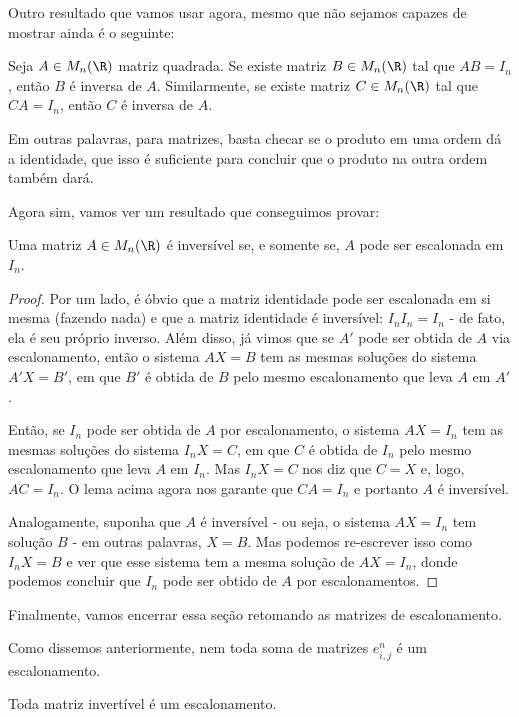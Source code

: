 Outro resultado que vamos usar agora, mesmo que não sejamos capazes de mostrar ainda é o seguinte:

\begin{lemma}
	Seja $A\in M_n(\R)$ matriz quadrada. Se existe matriz $B\in M_n(\R)$ tal que $AB=I_n$, então $B$ é inversa de $A$. Similarmente, se existe matriz $C\in M_n(\R)$ tal que $CA=I_n$, então $C$ é inversa de $A$.
\end{lemma}

Em outras palavras, para matrizes, basta checar se o produto em uma ordem dá a identidade, que isso é suficiente para concluir que o produto na outra ordem também dará.

Agora sim, vamos ver um resultado que conseguimos provar:

\begin{lemma}
	Uma matriz $A\in M_n(\R)$ é inversível se, e somente se, $A$ pode ser escalonada em $I_n$.
\end{lemma}
\begin{proof}
	Por um lado, é óbvio que a matriz identidade pode ser escalonada em si mesma (fazendo nada) e que a matriz identidade é inversível: $I_nI_n=I_n$ - de fato, ela é seu próprio inverso. Além disso, já vimos que se $A'$ pode ser obtida de $A$ via escalonamento, então o sistema $AX=B$ tem as mesmas soluções do sistema $A'X=B'$, em que $B'$ é obtida de $B$ pelo mesmo escalonamento que leva $A$ em $A'$. 
	
	Então, se $I_n$ pode ser obtida de $A$ por escalonamento, o sistema $AX=I_n$ tem as mesmas soluções do sistema $I_nX=C$, em que $C$ é obtida de $I_n$ pelo mesmo escalonamento que leva $A$ em $I_n$. Mas $I_nX=C$ nos diz que $C=X$ e, logo, $AC=I_n$. O lema acima agora nos garante que $CA=I_n$ e portanto $A$ é inversível.
	
	\bigskip
	Analogamente, suponha que $A$ é inversível - ou seja, o sistema $AX=I_n$ tem solução $B$ - em outras palavras, $X=B$. Mas podemos re-escrever isso como $I_nX=B$ e ver que esse sistema tem a mesma solução de $AX=I_n$, donde podemos concluir que $I_n$ pode ser obtido de $A$ por escalonamentos.
\end{proof}

Finalmente, vamos encerrar essa seção retomando as matrizes de escalonamento.

Como dissemos anteriormente, nem toda soma de matrizes $e^n_{i,j}$ é um escalonamento.

\begin{prop}
	Toda matriz invertível é um escalonamento.
\end{prop}


